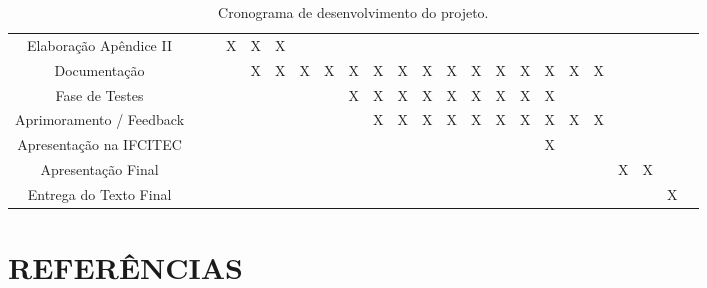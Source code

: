 \documentclass[12pt,a4paper]{article}
\begin{document}
\begin{table}[htb]
\begin{center}
{\begin{tabular}{| c | c *{10}{ c | c } c|}
						 Elaboração Apêndice II    &   &   & X & X & X &   &   &   &   &   &   &   &   &   &   &   &   &   &   &   &   &   \\
						 Documentação              &   &   &   & X & X & X & X & X & X & X & X & X & X & X & X & X & X & X &   &   &   &   \\
						 Fase de Testes            &   &   &   &   &   &   &   & X & X & X & X & X & X & X & X & X &   &   &   &   &   &   \\
						 Aprimoramento / Feedback  &   &   &   &   &   &   &   &   & X & X & X & X & X & X & X & X & X & X &   &   &   &   \\
						 Apresentação na IFCITEC   &   &   &   &   &   &   &   &   &   &   &   &   &   &   &   & X &   &   &   &   &   &   \\
						 Apresentação Final        &   &   &   &   &   &   &   &   &   &   &   &   &   &   &   &   &   &   & X & X &   &   \\
						 Entrega do Texto Final    &   &   &   &   &   &   &   &   &   &   &   &   &   &   &   &   &   &   &   &   & X &   \\
						 \hline
					\end{tabular}
			}
			\caption{Cronograma de desenvolvimento do projeto.}
		\end{center}
	\end{table}
	\newpage
	\section*{REFERÊNCIAS}

		\printbibliography[heading=none]

		\newpage
\end{document}
